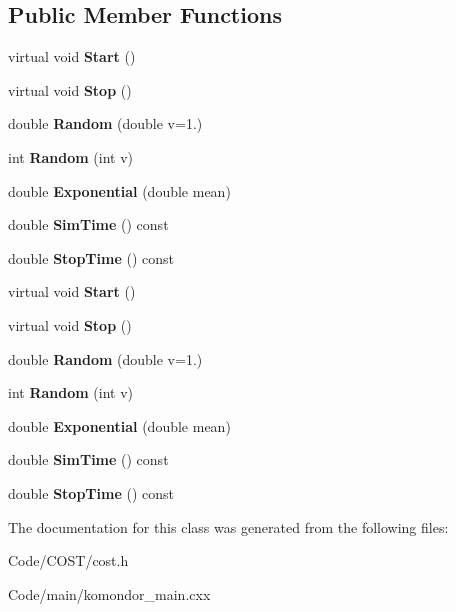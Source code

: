 \subsection*{Public Member Functions}
\begin{DoxyCompactItemize}
\item 
\mbox{\label{classTypeII_a0ef82b8fa34253eda08b5b91472fc72c}} 
virtual void {\bfseries Start} ()
\item 
\mbox{\label{classTypeII_ae081b50eabdab34d1cd2ee7f72ab000d}} 
virtual void {\bfseries Stop} ()
\item 
\mbox{\label{classTypeII_a9150731a14b0c2168c1430b4e32635c3}} 
double {\bfseries Random} (double v=1.)
\item 
\mbox{\label{classTypeII_a100e5ca8c126fab1459b87cbe398cc45}} 
int {\bfseries Random} (int v)
\item 
\mbox{\label{classTypeII_a8f1eb85e4951ef5f1275c04b74bf6373}} 
double {\bfseries Exponential} (double mean)
\item 
\mbox{\label{classTypeII_a86af61be9b45d11ae1b8f0d5b13f0eed}} 
double {\bfseries Sim\+Time} () const
\item 
\mbox{\label{classTypeII_ac99e827d854e8b48ca92c6823b91954a}} 
double {\bfseries Stop\+Time} () const
\item 
\mbox{\label{classTypeII_a0ef82b8fa34253eda08b5b91472fc72c}} 
virtual void {\bfseries Start} ()
\item 
\mbox{\label{classTypeII_ae081b50eabdab34d1cd2ee7f72ab000d}} 
virtual void {\bfseries Stop} ()
\item 
\mbox{\label{classTypeII_a9150731a14b0c2168c1430b4e32635c3}} 
double {\bfseries Random} (double v=1.)
\item 
\mbox{\label{classTypeII_a100e5ca8c126fab1459b87cbe398cc45}} 
int {\bfseries Random} (int v)
\item 
\mbox{\label{classTypeII_a8f1eb85e4951ef5f1275c04b74bf6373}} 
double {\bfseries Exponential} (double mean)
\item 
\mbox{\label{classTypeII_a86af61be9b45d11ae1b8f0d5b13f0eed}} 
double {\bfseries Sim\+Time} () const
\item 
\mbox{\label{classTypeII_ac99e827d854e8b48ca92c6823b91954a}} 
double {\bfseries Stop\+Time} () const
\end{DoxyCompactItemize}


The documentation for this class was generated from the following files\+:\begin{DoxyCompactItemize}
\item 
Code/\+C\+O\+S\+T/cost.\+h\item 
Code/main/komondor\+\_\+main.\+cxx\end{DoxyCompactItemize}
